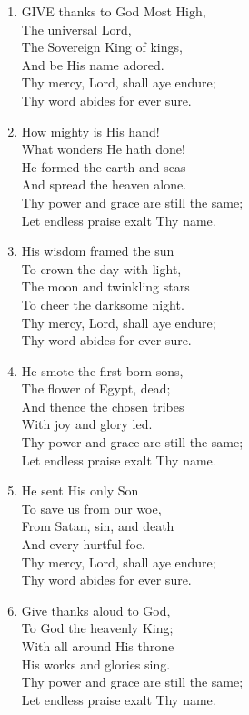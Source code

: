 \documentclass[11pt,a4paper]{article}
\begin{document}
\begin{enumerate}
    \item GIVE thanks to God Most High, \\
        The universal Lord, \\
        The Sovereign King of kings, \\
        And be His name adored. \\
        Thy mercy, Lord, shall aye endure; \\
        Thy word abides for ever sure.

    \item How mighty is His hand! \\
        What wonders He hath done! \\
        He formed the earth and seas \\
        And spread the heaven alone. \\
        Thy power and grace are still the same; \\
        Let endless praise exalt Thy name.

    \item His wisdom framed the sun \\
        To crown the day with light, \\
        The moon and twinkling stars \\
        To cheer the darksome night. \\
        Thy mercy, Lord, shall aye endure; \\
        Thy word abides for ever sure.

    \item He smote the first-born sons, \\
        The flower of Egypt, dead; \\
        And thence the chosen tribes \\
        With joy and glory led. \\
        Thy power and grace are still the same; \\
        Let endless praise exalt Thy name.

    \item He sent His only Son \\
        To save us from our woe, \\
        From Satan, sin, and death \\
        And every hurtful foe. \\
        Thy mercy, Lord, shall aye endure; \\
        Thy word abides for ever sure.

    \item Give thanks aloud to God, \\
        To God the heavenly King; \\
        With all around His throne \\
        His works and glories sing. \\
        Thy power and grace are still the same; \\
        Let endless praise exalt Thy name.

\end{enumerate}
\end{document}
